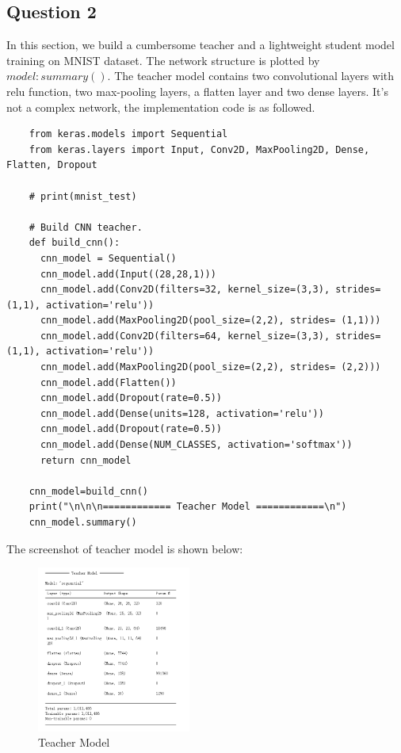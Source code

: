 \documentclass[conference]{IEEEtran}
\begin{document}
\subsection{Question 2}
In this section, we build a cumbersome teacher and a lightweight student model training on MNIST dataset. The network structure is plotted by $model:summary()$.
The teacher model contains two convolutional layers with relu function, two max-pooling layers, a flatten layer and two dense layers. It's not a complex network, the implementation code is as followed.
\begin{lstlisting}
    from keras.models import Sequential
    from keras.layers import Input, Conv2D, MaxPooling2D, Dense, Flatten, Dropout
    
    # print(mnist_test)
    
    # Build CNN teacher.
    def build_cnn():
      cnn_model = Sequential()
      cnn_model.add(Input((28,28,1)))
      cnn_model.add(Conv2D(filters=32, kernel_size=(3,3), strides= (1,1), activation='relu'))
      cnn_model.add(MaxPooling2D(pool_size=(2,2), strides= (1,1)))
      cnn_model.add(Conv2D(filters=64, kernel_size=(3,3), strides= (1,1), activation='relu'))
      cnn_model.add(MaxPooling2D(pool_size=(2,2), strides= (2,2)))
      cnn_model.add(Flatten())
      cnn_model.add(Dropout(rate=0.5))
      cnn_model.add(Dense(units=128, activation='relu'))
      cnn_model.add(Dropout(rate=0.5))
      cnn_model.add(Dense(NUM_CLASSES, activation='softmax'))
      return cnn_model
    
    cnn_model=build_cnn()
    print("\n\n\n============ Teacher Model ============\n")
    cnn_model.summary()
\end{lstlisting} \par
The screenshot of teacher model is shown below:
\begin{figure}[h] 
    \centering
    \includegraphics[width=0.45\textwidth]{./graphs/Teacher_MNIST.png}
    \caption{Teacher Model}
    \label{Fig.t1q3e}
\end{figure}
\end{document}
